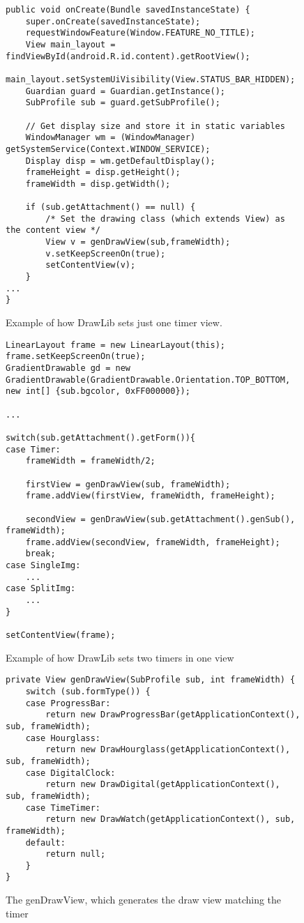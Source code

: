 \begin{figure}[H]
\begin{lstlisting}
public void onCreate(Bundle savedInstanceState) {
	super.onCreate(savedInstanceState);	
	requestWindowFeature(Window.FEATURE_NO_TITLE);
	View main_layout = findViewById(android.R.id.content).getRootView();
	main_layout.setSystemUiVisibility(View.STATUS_BAR_HIDDEN);
	Guardian guard = Guardian.getInstance();
	SubProfile sub = guard.getSubProfile();

	// Get display size and store it in static variables
	WindowManager wm = (WindowManager) getSystemService(Context.WINDOW_SERVICE);
	Display disp = wm.getDefaultDisplay();
	frameHeight = disp.getHeight();
	frameWidth = disp.getWidth();				

	if (sub.getAttachment() == null) {
		/* Set the drawing class (which extends View) as the content view */
		View v = genDrawView(sub,frameWidth);
		v.setKeepScreenOn(true);
		setContentView(v);
	} 
...
}
\end{lstlisting}
\caption{Example of how DrawLib sets just one timer view.}%
\label{code:backend_drawlib_singletimer}%
\end{figure}

\begin{figure}[H]%
\begin{lstlisting}
LinearLayout frame = new LinearLayout(this);
frame.setKeepScreenOn(true);
GradientDrawable gd = new GradientDrawable(GradientDrawable.Orientation.TOP_BOTTOM, new int[] {sub.bgcolor, 0xFF000000});

...

switch(sub.getAttachment().getForm()){
case Timer:
	frameWidth = frameWidth/2;
	
	firstView = genDrawView(sub, frameWidth);
	frame.addView(firstView, frameWidth, frameHeight);
	
	secondView = genDrawView(sub.getAttachment().genSub(), frameWidth);
	frame.addView(secondView, frameWidth, frameHeight);
	break;
case SingleImg:
	...
case SplitImg:
	...
}

setContentView(frame);
\end{lstlisting}
\caption{Example of how DrawLib sets two timers in one view}%
\label{code:backend_drawlib_splittimer}%
\end{figure}

\begin{figure}[H]%
\begin{lstlisting}
private View genDrawView(SubProfile sub, int frameWidth) {
	switch (sub.formType()) {
	case ProgressBar:
		return new DrawProgressBar(getApplicationContext(), sub, frameWidth);
	case Hourglass:
		return new DrawHourglass(getApplicationContext(), sub, frameWidth);
	case DigitalClock:
		return new DrawDigital(getApplicationContext(), sub, frameWidth);
	case TimeTimer:
		return new DrawWatch(getApplicationContext(), sub, frameWidth);
	default:
		return null;
	}
}
\end{lstlisting}
\caption{The genDrawView, which generates the draw view matching the timer}%
\label{code:backend_drawlib_gendrawview}%
\end{figure}

